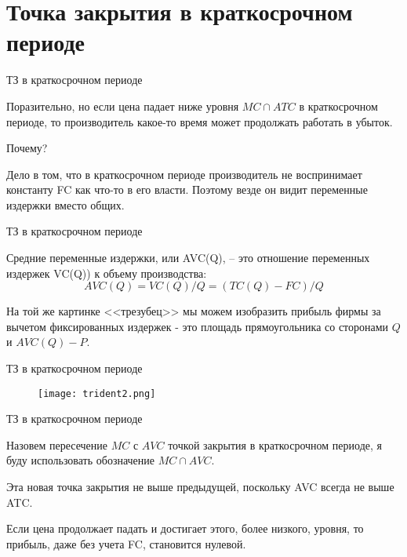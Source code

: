 \documentclass{beamer}
\begin{document}
\section{Точка закрытия в краткосрочном периоде}

\begin{frame}{ТЗ в краткосрочном периоде}

Поразительно, но если цена падает ниже уровня $MC \cap ATC$ в краткосрочном периоде, то производитель какое-то время может продолжать работать в убыток.

Почему?

Дело в том, что в краткосрочном периоде производитель не воспринимает константу FC как что-то в его власти. Поэтому везде он видит переменные издержки вместо общих.
\end{frame}

\begin{frame}{ТЗ в краткосрочном периоде}

\begin{definition}
\alert{Средние переменные издержки}, или AVC(Q), – это отношение переменных издержек VC(Q)) к объему производства:
$$AVC(Q) = VC(Q)/Q = (TC(Q) - FC)/Q$$
\end{definition}

На той же картинке <<трезубец>> мы можем изобразить прибыль фирмы за вычетом фиксированных издержек - это площадь прямоугольника со сторонами $Q$ и $AVC(Q)-P$. 

\end{frame}

\begin{frame}{ТЗ в краткосрочном периоде}

\begin{figure}[hbt]
\centering
\texttt{[image: trident2.png]}
\end{figure}

\end{frame}


\begin{frame}{ТЗ в краткосрочном периоде}

\begin{definition}
Назовем пересечение $MC$ с $AVC$ \alert{точкой закрытия в краткосрочном периоде}, я буду использовать обозначение $MC \cap AVC$.
\end{definition}

Эта новая точка закрытия не выше предыдущей, поскольку AVC всегда не выше ATC. 

Если цена продолжает падать и достигает этого, более низкого, уровня, то прибыль, даже без учета FC, становится нулевой.

\end{frame}
\end{document}
